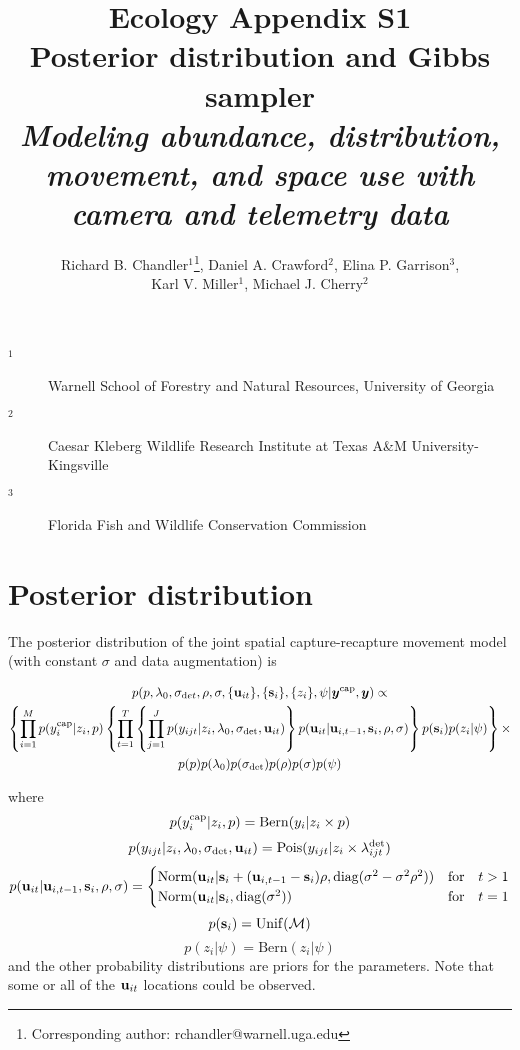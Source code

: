 \documentclass[12pt]{article}
\title{Ecology Appendix S1 \\ Posterior distribution and Gibbs sampler \\ \it Modeling abundance, distribution, movement, and space
  use with camera and telemetry data}
\author{Richard B. Chandler$^1$\footnote{Corresponding author: rchandler@warnell.uga.edu}, Daniel A. Crawford$^2$, Elina P. Garrison$^3$, \\
  Karl V. Miller$^1$, Michael J. Cherry$^2$}
\newcommand{\bs}{{\bf s}}
\newcommand{\bsi}{{\bf s}_i}
\newcommand{\bu}{{\bf u}}
\newcommand{\buit}{{\bf u}_{it}}
\newcommand{\buip}{{\bf u}_{i,t-1}}
\begin{document}
\maketitle

\vspace{12pt}

\begin{description}%
\item[$^1$] Warnell School of Forestry and Natural Resources, University of Georgia %
\item[$^2$] Caesar Kleberg Wildlife Research Institute at Texas A\&M University-Kingsville %
\item[$^3$] Florida Fish and Wildlife Conservation Commission %
\end{description}

\clearpage

\section*{Posterior distribution}

The posterior distribution of the joint spatial capture-recapture
movement model (with constant $\sigma$ and data augmentation) is  

\begin{multline}
  p(p, \lambda_0, \sigma_{\mathrm det}, \rho, \sigma, \{\bu_{it}\}, \{\bs_i\}, \{z_i\}, \psi | {\bm y}^{\rm cap},{\bm y}) \propto \\
  \left\{\prod_{i=1}^M p(y_i^{\rm cap}|z_i, p)
    \left\{\prod_{t=1}^T\left\{\prod_{j=1}^Jp(y_{ijt}|z_i,\lambda_0,\sigma_{\rm det},\buit)
    \right\}p(\buit|\bu_{i,t-1},\bsi,\rho,\sigma)\right\} %
  p(\bsi)p(z_i|\psi)\right\} \times \\
p(p)p(\lambda_0)p(\sigma_{\rm det})p(\rho)p(\sigma)p(\psi) \\
  \label{eq:post}
\end{multline}

where
\[
  p(y_i^{\rm cap}|z_i, p) = \mathrm{Bern}(y_i|z_i\times p)
\]
\[
  p(y_{ijt}|z_i,\lambda_0,\sigma_{\rm det},\buit) = \mathrm{Pois}(y_{ijt}|z_i \times \lambda^{\rm det}_{ijt})
\]
\[
  p(\buit|\bu_{i,t-1},\bsi,\rho,\sigma) =
  \begin{cases}
    \mathrm{Norm}(\buit|\bsi+(\buip-\bsi)\rho, \mathrm{diag}(\sigma^2
    - \sigma^2\rho^2)) & \mathrm{for}\quad t>1 \\
    \mathrm{Norm}(\buit|\bsi, \mathrm{diag}(\sigma^2)) & \mathrm{for}\quad t=1 \\
  \end {cases}
\]
\[
  p(\bsi) = \mathrm{Unif}(\mathcal M)
\]
\[
  p(z_i|\psi) = \mathrm{Bern}(z_i|\psi)
\]
and the other probability distributions are priors for the
parameters. Note that some or all of the $\buit$ locations could be
observed.  
\end{document}
